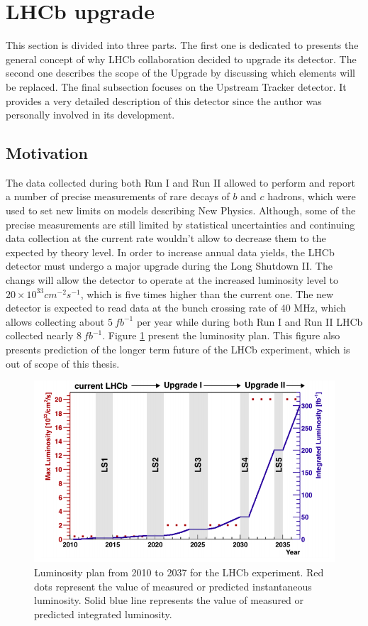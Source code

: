 \section{LHCb upgrade}
This section is divided into three parts. The first one is dedicated to presents the general concept of why LHCb collaboration decided to upgrade its detector. The second one describes the scope of the Upgrade by discussing which elements will be replaced. The final subsection focuses on the Upstream Tracker detector. It provides a very detailed description of this detector since the author was personally involved in its development.  

\subsection{Motivation}

The data collected during both Run I and Run II allowed to perform and report a number of precise measurements of rare decays of $b$ and $c$ hadrons, which were used to set new limits on models describing New Physics. Although, some of the precise measurements are still limited by statistical uncertainties and continuing data collection at the current rate wouldn’t allow to decrease them to the expected by theory level. In order to increase annual data yields, the LHCb detector must undergo a major upgrade during the Long Shutdown II.  The changs will allow the detector to operate at the increased luminosity level to $20 \times 10^{33} cm^{-2}s^{-1}$, which is five times higher than the current one. The new detector is expected to read data at the bunch crossing rate of 40 MHz, which allows collecting about $5~ fb^{-1}$ per year while during both Run I and Run II LHCb collected nearly $8~ fb^{-1}$. Figure \ref{fig:lhcb_lumi} present the luminosity plan. This figure also presents prediction of the longer term future of the LHCb experiment, which is out of scope of this thesis.  

\begin{figure}[!h]
\centering
\includegraphics[width=\linewidth]{figures/lhcb_lumi.PNG}
\caption{Luminosity plan from 2010 to 2037 for the LHCb experiment. Red dots represent
the value of measured or predicted instantaneous luminosity. Solid blue line represents the value of measured or predicted integrated luminosity.
\label{fig:lhcb_lumi}}
\end{figure}


